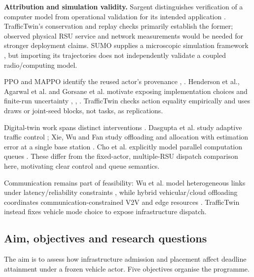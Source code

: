 \documentclass[12pt,a4paper]{article}
\begin{document}
\textbf{Attribution and simulation validity.} Sargent distinguishes verification of a computer model from operational validation for its intended application \cite{ref21}. TrafficTwin's conservation and replay checks primarily establish the former; observed physical RSU service and network measurements would be needed for stronger deployment claims. SUMO supplies a microscopic simulation framework \cite{ref22}, but importing its trajectories does not independently validate a coupled radio/computing model.

PPO and MAPPO identify the reused actor's provenance \cite{ref23}, \cite{ref24}. Henderson et al., Agarwal et al. and Gorsane et al. motivate exposing implementation choices and finite-run uncertainty \cite{ref25}, \cite{ref26}, \cite{ref27}. TrafficTwin checks action equality empirically and uses draws or joint-seed blocks, not tasks, as replications.

Digital-twin work spans distinct interventions \cite{ref28}. Dasgupta et al. study adaptive traffic control \cite{ref29}; Xie, Wu and Fan study offloading and allocation with estimation error at a single base station \cite{ref30}. Cho et al. explicitly model parallel computation queues \cite{ref31}. These differ from the fixed-actor, multiple-RSU dispatch comparison here, motivating clear control and queue semantics.

Communication remains part of feasibility: Wu et al. model heterogeneous links under latency/reliability constraints \cite{ref6}, while hybrid vehicular/cloud offloading coordinates communication-constrained V2V and edge resources \cite{ref32}. TrafficTwin instead fixes vehicle mode choice to expose infrastructure dispatch.

\FloatBarrier
\subsection{Aim, objectives and research questions}\label{sec:1.3}

The aim is to assess how infrastructure admission and placement affect deadline attainment under a frozen vehicle actor. Five objectives organise the programme.
\end{document}
